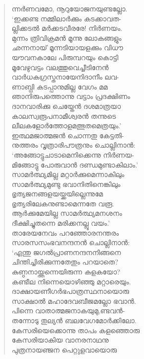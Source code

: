 \begin{verse}
ന്നര്‍ണവമോ, നൂറുയോജനയുണ്ടല്ലോ.\\
‘ഇക്കണ്ട നമ്മിലാര്‍ക്കും കടക്കാവത-\\
ല്ലിക്കടല്‍ മര്‍ക്കടവീരരേ! നിര്‍ണയം.\\
മുന്നം ത്രിവിക്രമന്‍ മൂന്നു ലോകങ്ങളും\\
ഛന്നനായ് മൂന്നടിയായളക്കും വിധൗ\\
യൗവനകാലേ പിരുമ്പറയും കൊട്ടി\\
മൂവേഴുവട്ടം വലത്തുവെച്ചീടിനേന്‍\\
വാര്‍ധകഗ്രസ്തനായേനിദാനീം ലവ-\\
ണാബ്ധി കടപ്പാനുമില്ല വേഗം മമ\\
ഞാനിരുപത്തൊന്നു വട്ടാം പ്രദക്ഷിണം\\
ദാനവാരിക്കു ചെയ്തേന്‍ ദശമാത്രയാ\\
കാലസ്വരൂപനാമീശ്വരന്‍ തന്നുടെ\\
ലീലകളോര്‍ത്തോളമത്ഭുതമെത്രയും.’\\
ഇത്ഥമജാത്മജന്‍ ചൊന്നതു കേട്ടതി-\\
നുത്തരം വൃത്രാരിപൗത്രനും ചൊല്ലിനാന്‍:\\
‘അങ്ങോ‌ട്ടുചാടാമെനിക്കെന്നു നിര്‍ണയ-\\
മിങ്ങോട്ടു പോരുവാന്‍ ദണ്ഡമുണ്ടാകിലാം.’\\
സാമര്‍ത്ഥ്യമില്ല മറ്റാര്‍ക്കുമെന്നാകിലും\\
സാമര്‍ത്ഥ്യമുണ്ടു ഭവാനിതിനെങ്കിലും\\
ഭൃത്യജനങ്ങളയയ്ക്കയില്ലെന്നുമേ\\
ഭൃത്യരിലേകനുണ്ടാമെന്നതേ വരൂ.\\
ആര്‍ക്കുമേയില്ല സാമര്‍ത്ഥ്യമനശനം\\
ദീക്ഷിച്ചുതന്നെ മരിക്കനല്ലൂ വയം.’\\
താരേയനേവം പറഞ്ഞോരനന്തരം\\
സാരസസംഭവനന്ദനന്‍ ചൊല്ലിനാന്‍:\\
‘എന്തു ജഗല്‍പ്രാണനന്ദനനിങ്ങനെ\\
ചിന്തിച്ചിരിക്കുന്നതേതും പറയാതെ?\\
കുണ്ഠനായ്ത്തന്നെയിരുന്ന കളകയോ?\\
കണ്ടീല നിന്നെയൊഴിഞ്ഞു മറ്റാരെയും.\\
ദാക്ഷായണീഗര്‍ഭപാത്രസ്ഥനായൊരു\\
സാക്ഷാല്‍ മഹാദേവബീജമല്ലോ ഭവാന്‍.\\
പിന്നെ വാതാത്മജനാകയുമു,ണ്ടവന്‍-\\
തന്നോടു തുല്യന്‍ ബലവേഗമോര്‍ക്കിലോ.\\
കേസരിയെക്കൊന്നു താപം കളഞ്ഞൊരു\\
കേസരിയാകിയ വാനരനാഥനു\\
പുത്രനായഞ്ജന പെറ്റുളവായൊരു\\

\end{verse}
